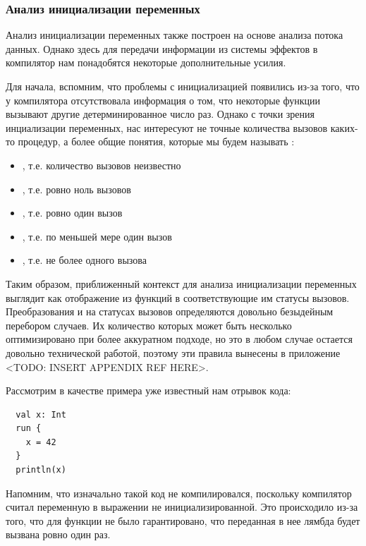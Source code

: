 \subsubsection{Анализ инициализации переменных}

Анализ инициализации переменных также построен на основе анализа потока данных. Однако здесь для передачи информации из системы эффектов в компилятор нам понадобятся некоторые дополнительные усилия.

Для начала, вспомним, что проблемы с инициализацией появились из-за того, что у компилятора отсутствовала информация о том, что некоторые функции вызывают другие детерминированное число раз. Однако с точки зрения инциализации переменных, нас интересуют не точные количества вызовов каких-то процедур, а более общие понятия, которые мы будем называть :

\begin{itemize}
  \item {}, т.е. количество вызовов неизвестно

  \item {}, т.е. ровно ноль вызовов

  \item {}, т.е. ровно один вызов

  \item {}, т.е. по меньшей мере один вызов

  \item {}, т.е. не более одного вызова
\end{itemize}

Таким образом, приближенный контекст для анализа инициализации переменных выглядит как отображение из функций в соответствующие им статусы вызовов. Преобразования  и  на статусах вызовов определяются довольно безыдейным перебором случаев. Их количество которых может быть несколько оптимизировано при более аккуратном подходе, но это в любом случае остается довольно технической работой, поэтому эти правила вынесены в приложение <TODO: INSERT APPENDIX REF HERE>.

Рассмотрим в качестве примера уже известный нам отрывок кода:

\begin{verbatim}
  val x: Int
  run {
    x = 42
  }
  println(x)
\end{verbatim}

Напомним, что изначально такой код не компилировался, поскольку компилятор считал переменную  в выражении  не инициализированной. Это происходило из-за того, что для функции  не было гарантировано, что переданная в нее лямбда  будет вызвана ровно один раз.

